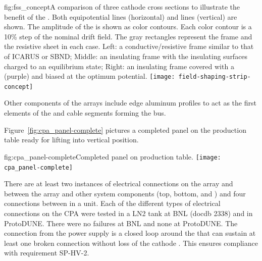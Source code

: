 \begin{dunefigure}{fig:fss_concept}{A comparison of three cathode cross sections to illustrate the benefit of the . Both equipotential lines (horizontal) and \efield{} lines (vertical) are shown.  The amplitude of the \efield{} is shown as color contours. Each color contour is a 10\% step of the nominal drift field.  The gray rectangles represent the frame and the resistive sheet in each case. Left: a conductive/resistive frame similar to that of ICARUS or SBND; Middle: an insulating frame with the insulating surfaces charged to an equilibrium state; Right: an insulating frame covered with a  (purple) and biased at the optimum potential. }
\texttt{[image: field-shaping-strip-concept]} %
\end{dunefigure}

Other  components of the  arrays include  edge aluminum profiles to act as the first elements of the  and cable segments forming the  bus.

Figure~\ref{fig:cpa_panel-complete} pictures a completed   panel on the production table ready for lifting into vertical position. %

\begin{dunefigure}{fig:cpa_panel-complete}{Completed   panel on production table.}
\texttt{[image: cpa\_panel-complete]}
\end{dunefigure}

There are at least two instances of electrical connections on the  array and between the  array and other  system components (top, bottom, and ) and four connections between  in a  unit.  Each of the different types of electrical connections on the CPA were tested in a LN2 tank at BNL (docdb 2338) and in ProtoDUNE. There were no failures at BNL and none at ProtoDUNE.  The  connection from the  power supply is a closed loop around the  that can sustain at least one broken connection without loss of the cathode .  This ensures compliance with requirement SP-HV-2.

